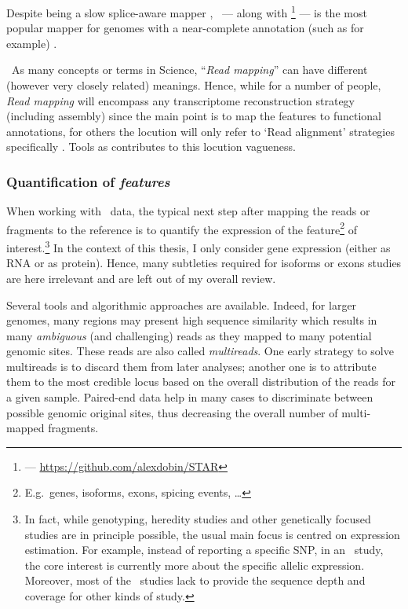 Despite being a slow splice-aware mapper ,
\toph\ --- along with
\footnote{ --- \href{https://github.com/alexdobin/STAR}%
{https://github.com/alexdobin/STAR}}  --- is the most
popular mapper for genomes with a near-complete annotation (such as
 for example) .


\NB\ As many concepts or terms in Science, \enquote{\emph{Read mapping}} can
have different (however very closely related) meanings.
Hence, while for a number of people, \emph{Read mapping} will encompass any
transcriptome reconstruction strategy (including  assembly) since
the main point is to map the features to functional annotations, for others the
locution will only refer to `Read alignment' strategies specifically
. Tools as  contributes to this
locution vagueness.

\subsubsection{Quantification of \emph{features}}

When working with \Rnaseq\ data, the typical next step after mapping the reads or
fragments to the reference is to quantify the expression of the
feature\footnote{E.g.\ genes, isoforms, exons, spicing events, \ldots}
of interest.\footnote{In fact, while genotyping, heredity
studies and other genetically focused studies are in principle possible, the usual
main focus is centred on expression estimation. For example, instead of
reporting a specific \gls{SNP}, in an \Rnaseq\ study, the core interest is
currently more about the specific allelic expression. Moreover, most of the \Rnaseq\
studies lack to provide the sequence depth and coverage for other kinds of study.}
In the context of this thesis, I only consider gene expression (either as \gls{RNA}
or as protein). Hence, many subtleties required for isoforms or exons studies are
here irrelevant and are left out of my overall review.

Several tools and algorithmic approaches are available.
Indeed, for larger genomes, many regions may present high sequence similarity
which results in many \emph{ambiguous} (and challenging) reads as they mapped to
many potential genomic sites. These reads are also called \emph{multireads}.
One early strategy to solve multireads is to discard them from later analyses;
another one is to attribute them to the most credible locus based on
the overall distribution of the reads for a given sample. 
Paired-end data help in many cases to discriminate between possible genomic
original sites, thus decreasing the overall number of multi-mapped fragments.

